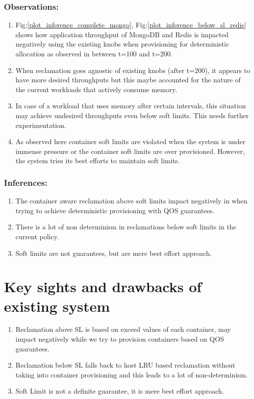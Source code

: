 	\subsubsection{Observations:}
	  \begin{enumerate}
	    \item Fig:\ref{plot_inference_complete_mongo}, Fig:\ref{plot_inference_below_sl_redis} shows how application throughput of 
MongoDB and Redis is impacted negatively using the existing knobs when provisioning for deterministic allocation as observed in between 
t=100 and t=200.
	    \item When reclamation goes agnostic of existing knobs (after t=200), it appears to have more desired throughputs but this 
maybe accounted for the nature of the current workloads that actively consume memory. 
	    \item  In case of a workload that uses memory after certain intervals, this situation may achieve undesired throughputs even 
below soft limits. This needs further experimentation.
	    \item As observed here container soft limits are violated when the system is under immense pressure or the container soft 
limits are over provisioned. However, the system tries its best efforts to maintain soft limits.  
	  \end{enumerate}
	  
	\subsubsection{Inferences:}
	  \begin{enumerate}
	    \item The container aware reclamation above soft limits impact negatively in when trying to achieve deterministic provisioning 
with QOS guarantees.
	    \item There is a lot of non determinism in reclamations below soft limits in the current policy.
	    \item Soft limits are not guarantees, but are mere best effort approach.
	  \end{enumerate}

  \section{Key sights and drawbacks of existing system}
    \begin{enumerate}
      \item Reclamation above SL is based on exceed values of each container, may impact negatively while we try to provision containers 
based on QOS guarantees.
      \item Reclamation below SL falls back to host LRU based reclamation without taking into container provisioning and this leads to a 
lot of non-determinism.
      \item Soft Limit is not a definite guarantee, it is mere best effort approach.
    \end{enumerate}
